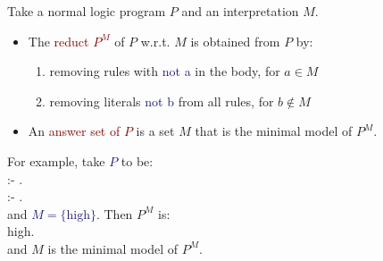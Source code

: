 \begin{minipage}{0.5\textwidth}
Take a \textcolor{PineGreen}{normal logic program $P$} and an \textcolor{PineGreen}{interpretation $M$}.
\begin{itemize}
    \item The \textcolor{Maroon}{reduct $P^M$} of $P$ w.r.t. $M$ is obtained from $P$ by:
    \begin{enumerate}
        \item removing rules with \textcolor{MidnightBlue}{not a} in the body, for $a \in M$
        \item removing literals \textcolor{MidnightBlue}{not b} from all rules, for $b \not \in M$
    \end{enumerate}
    \item An \textcolor{Maroon}{answer set of $P$} is a set $M$ that is the minimal model of $P^M$.
\end{itemize}
\end{minipage}
\begin{minipage}{0.5\textwidth}
\centering
For example, take \textcolor{MidnightBlue}{$P$} to be: \\
\vspace{0.25cm}
 :- . \\
 :- . \\
\vspace{0.25cm}
and \textcolor{MidnightBlue}{$M = \{ \text{high} \}$}. Then $P^M$ is: \\
\vspace{0.25cm}
high.\\
\vspace{0.25cm}
and $M$ is the minimal model of $P^M$.
\end{minipage}

